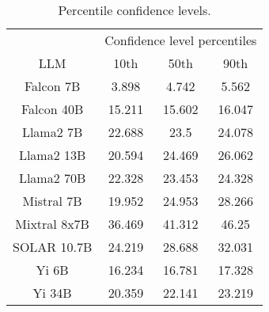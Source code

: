 \begin{table*}
\centering
\begin{tabular}{c|c|c|c}
& \multicolumn{3}{c}{Confidence level percentiles} \\ 
LLM & 10th & 50th & 90th\\ \hline
Falcon 7B & 3.898 & 4.742 & 5.562\\
Falcon 40B & 15.211 & 15.602 & 16.047\\
Llama2 7B & 22.688 & 23.5 & 24.078\\
Llama2 13B & 20.594 & 24.469 & 26.062\\
Llama2 70B & 22.328 & 23.453 & 24.328\\
Mistral 7B & 19.952 & 24.953 & 28.266\\
Mixtral 8x7B & 36.469 & 41.312 & 46.25\\
SOLAR 10.7B & 24.219 & 28.688 & 32.031\\
Yi 6B & 16.234 & 16.781 & 17.328\\
Yi 34B & 20.359 & 22.141 & 23.219\\
\hline
\end{tabular}
\caption{Percentile confidence levels.}
\label{tab:percentile_conf}
\end{table*}

